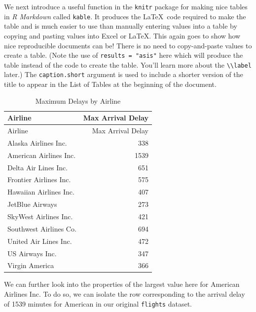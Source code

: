\documentclass[12pt,twoside]{reedthesis}
\begin{document}
  We next introduce a useful function in the \texttt{knitr} package for
  making nice tables in \emph{R Markdown} called \texttt{kable}. It
  produces the \LaTeX~code required to make the table and is much easier
  to use than manually entering values into a table by copying and pasting
  values into Excel or \LaTeX. This again goes to show how nice
  reproducible documents can be! There is no need to copy-and-paste values
  to create a table. (Note the use of \texttt{results\ =\ "asis"} here
  which will produce the table instead of the code to create the table.
  You'll learn more about the
  \texttt{\textbackslash{}\textbackslash{}label} later.) The
  \texttt{caption.short} argument is used to include a shorter version of
  the title to appear in the List of Tables at the beginning of the
  document.
  
  \begin{Shaded}
  \begin{Highlighting}[]
   \NormalTok{(}\NormalTok{, }\NormalTok{),}
         \CharTok{\textbackslash{}\textbackslash{}}\NormalTok{,}
         \NormalTok{)}
  \end{Highlighting}
  \end{Shaded}
  
  \begin{longtable}[]{@{}lr@{}}
  \caption{Maximum Delays by Airline \label{tab:max_delay}}\tabularnewline
  \toprule
  Airline & Max Arrival Delay\tabularnewline
  \midrule
  \endfirsthead
  \toprule
  Airline & Max Arrival Delay\tabularnewline
  \midrule
  \endhead
  Alaska Airlines Inc. & 338\tabularnewline
  American Airlines Inc. & 1539\tabularnewline
  Delta Air Lines Inc. & 651\tabularnewline
  Frontier Airlines Inc. & 575\tabularnewline
  Hawaiian Airlines Inc. & 407\tabularnewline
  JetBlue Airways & 273\tabularnewline
  SkyWest Airlines Inc. & 421\tabularnewline
  Southwest Airlines Co. & 694\tabularnewline
  United Air Lines Inc. & 472\tabularnewline
  US Airways Inc. & 347\tabularnewline
  Virgin America & 366\tabularnewline
  \bottomrule
  \end{longtable}
  
  We can further look into the properties of the largest value here for
  American Airlines Inc. To do so, we can isolate the row corresponding to
  the arrival delay of 1539 minutes for American in our original
  \texttt{flights} dataset.
  
\end{document}
